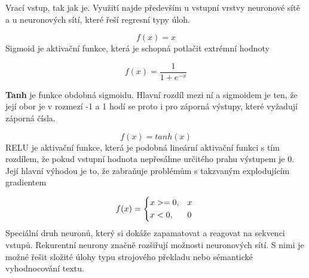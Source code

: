 Vrací vstup, tak jak je. Využití najde především u vstupní vrstvy neuronové sítě a u neuronových sítí, které řeší regresní typy úloh.
\\
$$f(x) = x$$
Sigmoid je aktivační funkce, která je schopná potlačit extrémní hodnoty 

$$f(x) = \frac{1}{1 + e^{-x}}$$

\textbf{Tanh} je funkce obdobná sigmoidu. Hlavní rozdíl mezi ní a sigmoidem je ten, že její obor je v rozmezí -1 a 1 hodí se proto i pro záporná výstupy, které vyžadují záporná čísla. \cite[s.~67]{fundementalsOfDeepLearning}

$$f(x) = tanh(x)$$
RELU je aktivační funkce, která je podobná lineární aktivační funkci s tím rozdílem, že pokud vstupní hodnota nepřesáhne určitého prahu výstupem je 0. Její hlavní výhodou je to, že zabraňuje problémům s takzvaným explodujícím gradientem \cite[s.~69]{fundementalsOfDeepLearning} \\

\[ 
f(x) = 
\begin{dcases*} 
\text{$x>=0$,} & $x$ \\ 
\text{$x<0$,} & 0 
\end{dcases*} 
\]
Speciální druh neuronů, který si dokáže zapamatovat a reagovat na sekvenci vstupů. Rekurentní neurony značně rozšiřují možnosti neuronových sítí. S nimi je možné řešit složité úlohy typu strojového překladu nebo sémantické vyhodnocování textu.


